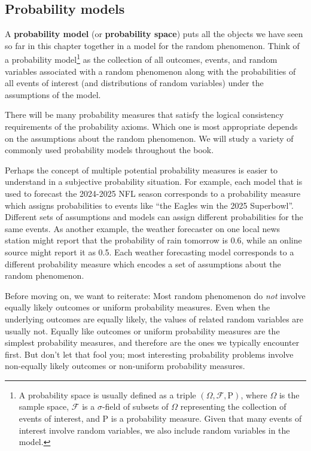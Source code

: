 \documentclass[
  letterpaper,
  DIV=11,
  numbers=noendperiod]{scrreprt}
\theoremstyle{plain}
\theoremstyle{definition}
\theoremstyle{definition}
\theoremstyle{definition}
\theoremstyle{remark}
\begin{document}
\subsection{Probability models}\label{probability-models}

A \textbf{probability model} (or \textbf{probability space}) puts all
the objects we have seen so far in this chapter together in a model for
the random phenomenon. Think of a probability model\footnote{A
  probability space is usually defined as a triple
  \((\Omega, \mathcal{F}, \textrm{P})\), where \(\Omega\) is the sample
  space, \(\mathcal{F}\) is a \(\sigma\)-field of subsets of \(\Omega\)
  representing the collection of events of interest, and \(\textrm{P}\)
  is a probability measure. Given that many events of interest involve
  random variables, we also include random variables in the model.} as
the collection of all outcomes, events, and random variables associated
with a random phenomenon along with the probabilities of all events of
interest (and distributions of random variables) under the assumptions
of the model.

There will be many probability measures that satisfy the logical
consistency requirements of the probability axioms. Which one is most
appropriate depends on the assumptions about the random phenomenon. We
will study a variety of commonly used probability models throughout the
book.

Perhaps the concept of multiple potential probability measures is easier
to understand in a subjective probability situation. For example, each
model that is used to forecast the 2024-2025 NFL season corresponds to a
probability measure which assigns probabilities to events like ``the
Eagles win the 2025 Superbowl''. Different sets of assumptions and
models can assign different probabilities for the same events. As
another example, the weather forecaster on one local news station might
report that the probability of rain tomorrow is 0.6, while an online
source might report it as 0.5. Each weather forecasting model
corresponds to a different probability measure which encodes a set of
assumptions about the random phenomenon.

Before moving on, we want to reiterate: Most random phenomenon do
\emph{not} involve equally likely outcomes or uniform probability
measures. Even when the underlying outcomes are equally likely, the
values of related random variables are usually not. Equally like
outcomes or uniform probability measures are the simplest probability
measures, and therefore are the ones we typically encounter first. But
don't let that fool you; most interesting probability problems involve
non-equally likely outcomes or non-uniform probability measures.
\end{document}
